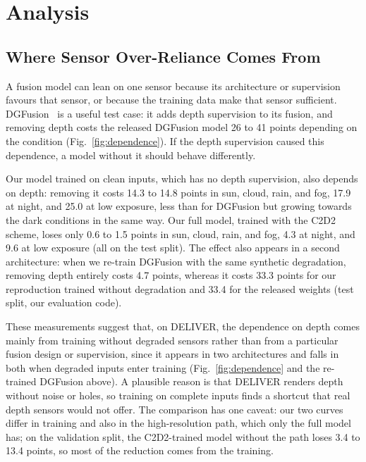 \let\paperFloatBarrierA\FloatBarrier\let\FloatBarrier\relax
\section{Analysis}\label{sec:analysis}
\let\FloatBarrier\paperFloatBarrierA


\subsection{Where Sensor Over-Reliance Comes From}
A fusion model can lean on one sensor because its architecture or supervision favours that sensor, or because the training data make that sensor sufficient. DGFusion~\cite{dgfusion2026} is a useful test case: it adds depth supervision to its fusion, and removing depth costs the released DGFusion model 26 to 41 points depending on the condition (Fig.~\ref{fig:dependence}). If the depth supervision caused this dependence, a model without it should behave differently.

Our model trained on clean inputs, which has no depth supervision, also depends on depth: removing it costs 14.3 to 14.8 points in sun, cloud, rain, and fog, 17.9 at night, and 25.0 at low exposure, less than for DGFusion but growing towards the dark conditions in the same way. Our full model, trained with the C2D2 scheme, loses only 0.6 to 1.5 points in sun, cloud, rain, and fog, 4.3 at night, and 9.6 at low exposure (all on the test split). The effect also appears in a second architecture: when we re-train DGFusion with the same synthetic degradation, removing depth entirely costs 4.7 points, whereas it costs 33.3 points for our reproduction trained without degradation and 33.4 for the released weights (test split, our evaluation code).

These measurements suggest that, on DELIVER, the dependence on depth comes mainly from training without degraded sensors rather than from a particular fusion design or supervision, since it appears in two architectures and falls in both when degraded inputs enter training (Fig.~\ref{fig:dependence} and the re-trained DGFusion above). A plausible reason is that DELIVER renders depth without noise or holes, so training on complete inputs finds a shortcut that real depth sensors would not offer. The comparison has one caveat: our two curves differ in training and also in the high-resolution path, which only the full model has; on the validation split, the C2D2-trained model without the path loses 3.4 to 13.4 points, so most of the reduction comes from the training.

